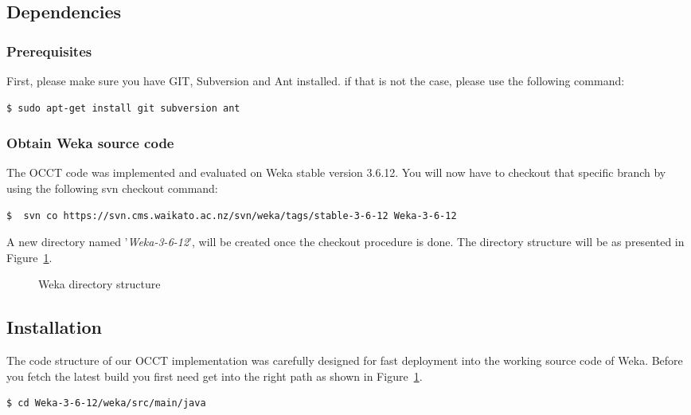 \documentclass[a4paper,12pt]{article}
\newcommand{\newpar}{\smallskip\noindent} %
\begin{document}
\begin{spacing}{1.5}
\subsection{Dependencies}
\subsubsection{Prerequisites}
First, please make sure you have GIT, Subversion and Ant installed.
if that is not the case, please use the following command:
\begin{lstlisting}[language=bash,frame=none,backgroundcolor=\color{anti-flashwhite}]
  $ sudo apt-get install git subversion ant
\end{lstlisting}

\subsubsection{Obtain Weka source code}
The OCCT code was implemented and evaluated on Weka stable version 3.6.12.
You will now have to checkout that specific branch by using the following svn checkout command:
\begin{lstlisting}[language=bash,frame=none,backgroundcolor=\color{anti-flashwhite}]
  $  svn co https://svn.cms.waikato.ac.nz/svn/weka/tags/stable-3-6-12 Weka-3-6-12
\end{lstlisting}
\newpar
A new directory named '{\em Weka-3-6-12}', will be created once the checkout procedure is done.
The directory structure will be as presented in Figure~\ref{fig:wekadir}.
\begin{figure}[!h]
    \caption{Weka directory structure}
    \label{fig:wekadir}
\end{figure}

\subsection{Installation}
The code structure of our OCCT implementation was carefully designed for fast deployment into the working source code of Weka. Before you fetch the latest build you first need get into the right path as shown in Figure~\ref{fig:wekadir}.
\begin{lstlisting}[language=bash,frame=none,backgroundcolor=\color{anti-flashwhite}]
  $ cd Weka-3-6-12/weka/src/main/java
\end{lstlisting}


\end{spacing}
\end{document}
